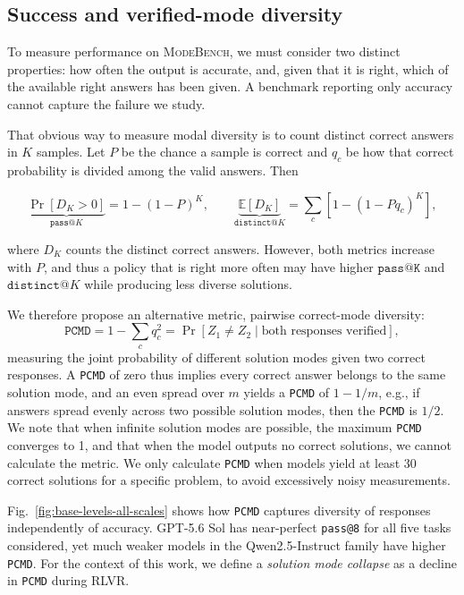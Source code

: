 \documentclass{article}
\newcommand{\1}{\mathbf 1}
\newcommand{\E}{\mathbb E}
\newcommand{\mb}{\textsc{ModeBench}}
\newcommand{\pmd}{\texttt{PCMD}}
\theoremstyle{remark}
\theoremstyle{definition}
\theoremstyle{plain}
\begin{document}
\subsection{Success and verified-mode diversity}
\label{sec:collapse-metrics}

To measure performance on \mb{}, we must consider two distinct properties: how often the output is accurate, and, given that it is right, which of the available right answers has been given.
A benchmark reporting only accuracy cannot capture the failure we study.

That obvious way to measure modal diversity is to count distinct correct answers in $K$ samples. Let $P$ be the chance a sample is correct and $q_c$ be how that correct probability is divided among the valid answers.
Then

\begin{equation}
 \underbrace{\Pr[D_K>0]}_{\texttt{pass@}K}=1-(1-P)^K,
 \qquad
 \underbrace{\E[D_K]}_{\texttt{distinct@}K}
 =\sum_c[1-(1-Pq_c)^K],
 \label{eq:main-occupancy}
\end{equation}

where $D_K$ counts the distinct correct answers. However, both metrics increase with $P$, and thus a policy that is right more often may have higher $\texttt{pass@K}$ and $\texttt{distinct@}K$ while producing less diverse solutions.

We therefore propose an alternative metric, pairwise correct-mode diversity:
\begin{equation}
 \pmd = 1-\sum_c q_c^2
 = \Pr[Z_1\ne Z_2\mid \text{both responses verified}],
 \label{eq:main-pmd}
\end{equation}
measuring the joint probability of different solution modes given two correct responses. A \pmd{} of zero thus implies every correct answer belongs to the same solution mode, and an even spread over $m$ yields a \pmd{} of $1-1/m$, e.g., if answers spread evenly across two possible solution modes, then the \pmd{} is $1/2$. We note that when infinite solution modes are possible, the maximum \pmd{} converges to 1, and that when the model outputs no correct solutions, we cannot calculate the metric. We only calculate \pmd{} when models yield at least 30 correct solutions for a specific problem, to avoid excessively noisy measurements.

Fig.~\ref{fig:base-levels-all-scales} shows how \pmd{} captures diversity of responses independently of accuracy. GPT-5.6 Sol has near-perfect \texttt{pass@8} for all five tasks considered, yet much weaker models in the Qwen2.5-Instruct family have higher \pmd{}.
For the context of this work, we define a \textit{solution mode collapse} as a decline in \pmd{} during RLVR.
\end{document}

